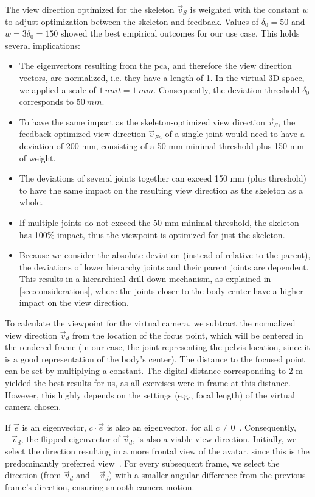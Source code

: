 The view direction optimized for the skeleton \(\vec{v}_S\) is weighted with the constant \(w\) to adjust optimization between the skeleton and feedback. Values of \(\delta_0 = 50\) and \(w = 3\delta_0 = 150\) showed the best empirical outcomes for our use case. This holds several implications:
\begin{itemize}
	\setlength{\itemsep}{-0.3cm}
	\item The eigenvectors resulting from the \acrshort{pca}, and therefore the view direction vectors, are normalized, i.e. they have a length of 1. In the virtual 3D space, we applied a scale of \(1\ unit = 1\ mm\). Consequently, the deviation threshold \(\delta_0\) corresponds to \(50\ mm\).
	\item To have the same impact as the skeleton-optimized view direction \(\vec{v}_S\), the feedback-optimized view direction \(\vec{v}_{Fn}\) of a single joint would need to have a deviation of 200 mm, consisting of a 50 mm minimal threshold plus 150 mm of weight.
	\item The deviations of several joints together can exceed 150 mm (plus threshold) to have the same impact on the resulting view direction as the skeleton as a whole.
	\item If multiple joints do not exceed the 50 mm minimal threshold, the skeleton has 100\% impact, thus the viewpoint is optimized for just the skeleton.
	\item Because we consider the absolute deviation (instead of relative to the parent), the deviations of lower hierarchy joints and their parent joints are dependent. This results in a hierarchical drill-down mechanism, as explained in \autoref{sec:considerations}, where the joints closer to the body center have a higher impact on the view direction.
\end{itemize}

To calculate the viewpoint for the virtual camera, we subtract the normalized view direction \(\vec{v}_d\) from the location of the focus point, which will be centered in the rendered frame (in our case, the joint representing the pelvis location, since it is a good representation of the body's center). The distance to the focused point can be set by multiplying a constant. The digital distance corresponding to 2 m yielded the best results for us, as all exercises were in frame at this distance. However, this highly depends on the settings (e.g., focal length) of the virtual camera chosen.


If \(\vec{e}\) is an eigenvector, \(c \cdot \vec{e}\) is also an eigenvector, for all \(c \neq 0\)~\cite{borisenko}. Consequently, \(-\vec{v}_d\), the flipped eigenvector of \(\vec{v}_d\), is also a viable view direction. Initially, we select the direction resulting in a more frontal view of the avatar, since this is the predominantly preferred view~\cite{zusne1970vpf}. For every subsequent frame, we select the direction (from 
\(\vec{v}_d\) and \(-\vec{v}_d\)) with a smaller angular difference from the previous frame's direction, ensuring smooth camera motion.

